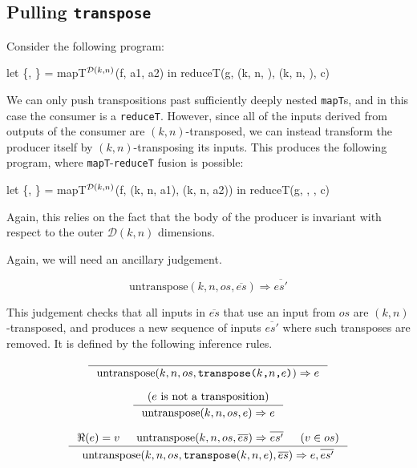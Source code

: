 \subsection{Pulling \texttt{transpose}}

Consider the following program:

\begin{colorcode}
let \{, \} = mapT\(^{\mathcal{D}(k,n)}\)(f, a1, a2) in
reduceT(g, (k, n, ), (k, n, ), c)
\end{colorcode}

We can only push transpositions past sufficiently deeply nested
\texttt{mapT}s, and in this case the consumer is a \texttt{reduceT}.
However, since all of the inputs derived from outputs of the consumer
are $(k,n)$-transposed, we can instead transform the producer itself
by $(k,n)$-transposing its inputs.  This produces the following
program, where \texttt{mapT}-\texttt{reduceT} fusion is possible:

\begin{colorcode}
let \{, \} = mapT\(^{\mathcal{D}(k,n)}\)(f, (k, n, a1), (k, n, a2)) in
reduceT(g, , , c)
\end{colorcode}

Again, this relies on the fact that the body of the producer is
invariant with respect to the outer $\mathcal{D}(k,n)$ dimensions.

Again, we will need an ancillary judgement.

\[
\boxed{
  \text{untranspose}(k, n, os, \overline{es}) \Rightarrow \overline{es'}
}
\]

This judgement checks that all inputs in $\overline{es}$ that use an
input from $os$ are $(k,n)$-transposed, and produces a new sequence of
inputs $\overline{es'}$ where such transposes are removed.  It is
defined by the following inference rules.

\[
\inference{
}{
  \text{untranspose}(k, n, os,\texttt{transpose($k$,$n$,$e$)}) \Rightarrow e
}
\]

\[
\inference{
  (\text{$e$ is not a transposition})
}{
  \text{untranspose}(k, n, os, e) \Rightarrow e
}
\]

\[
\inference{
  \Re(e) = v
  &
  \text{untranspose}(k, n, os, \overline{es}) \Rightarrow \overline{es'}
  &
  (v \in os)
}{
  \text{untranspose}(k, n, os, \texttt{transpose}(k, n, e), \overline{es}) \Rightarrow e, \overline{es'}
}
\]

